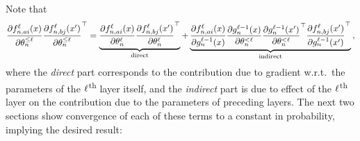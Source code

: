 Note that
\begin{align}
    \frac{
        \partial {f}^{\ell}_{n, a i}{(x)}
    }{
        \partial \theta_{n}^{\leq \ell}
    }
        \frac{
            \partial {f}^{\ell}_{n, b j}{(x')}
        }{
            \partial \theta_{n}^{\leq \ell}
        }^\top
    =
    \underbrace{
    \frac{
        \partial {f}^{\ell}_{n, a i}{(x)}
    }{
        \partial \theta_{n}^{\ell}
    }
        \frac{
            \partial {f}^{\ell}_{n, b j}{(x')}
        }{
            \partial \theta_{n}^{\ell}
        }^\top
    }_{\text{direct}}
    +
    \underbrace{
    \frac{
        \partial {f}^{\ell}_{n, a i}{(x)}
    }{
        \partial {g}^{\ell - 1}_{n}{(x)}
    }
    \frac{
        \partial {g}^{\ell - 1}_{n}{(x)}
    }{
        \partial \theta_{n}^{< \ell}
    }
        \frac{
            \partial {g}^{\ell - 1}_{n}{(x')}
        }{
            \partial \theta_{n}^{< \ell}
        }^\top
        \frac{
            \partial {f}^{\ell}_{n, b j}{(x')}
        }{
            \partial {g}^{\ell - 1}_{n}{(x')}
        }^\top
    }_{\text{indirect}}
    \, ,
\end{align}
where the \emph{direct} part corresponds to the contribution due to gradient w.r.t.\ the parameters of the $\ell$\textsuperscript{th} layer itself, and the \emph{indirect} part is due to effect of the $\ell$\textsuperscript{th} layer on the contribution due to the parameters of preceding layers.
The next two sections show convergence of each of these terms to a constant in probability, implying the desired result:

